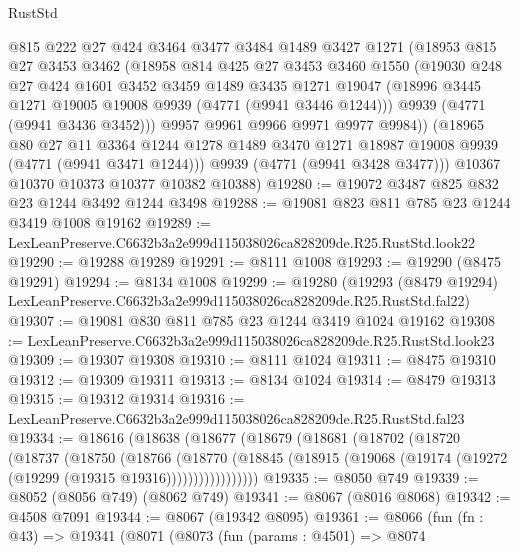 \begin{lexlean}{RustStd}
\begin{coremodule}
        @815
        @222
        @27
        @424
        @3464
        @3477
        @3484
        @1489
        @3427
        @1271
        (@18953
          @815
          @27
          @3453
          @3462
          (@18958
            @814
            @425
            @27
            @3453
            @3460
            @1550
            (@19030
              @248
              @27
              @424
              @1601
              @3452
              @3459
              @1489
              @3435
              @1271
              @19047
              (@18996 @3445 @1271 @19005 @19008 @9939 (@4771 (@9941 @3446 @1244)))
              @9939
              (@4771 (@9941 @3436 @3452)))
            @9957
            @9961
            @9966
            @9971
            @9977
            @9984))
        (@18965
          @80
          @27
          @11
          @3364
          @1244
          @1278
          @1489
          @3470
          @1271
          @18987
          @19008
          @9939
          (@4771 (@9941 @3471 @1244)))
        @9939
        (@4771 (@9941 @3428 @3477)))
      @10367
      @10370
      @10373
      @10377
      @10382
      @10388)
@19280 := @19072 @3487 @825 @832 @23 @1244 @3492 @1244 @3498
@19288 := @19081 @823 @811 @785 @23 @1244 @3419 @1008 @19162
@19289 := LexLeanPreserve.C6632b3a2e999d115038026ca828209de.R25.RustStd.look22
@19290 := @19288 @19289
@19291 := @8111 @1008
@19293 := @19290 (@8475 @19291)
@19294 := @8134 @1008
@19299 := @19280
    (@19293 (@8479 @19294) LexLeanPreserve.C6632b3a2e999d115038026ca828209de.R25.RustStd.fal22)
@19307 := @19081 @830 @811 @785 @23 @1244 @3419 @1024 @19162
@19308 := LexLeanPreserve.C6632b3a2e999d115038026ca828209de.R25.RustStd.look23
@19309 := @19307 @19308
@19310 := @8111 @1024
@19311 := @8475 @19310
@19312 := @19309 @19311
@19313 := @8134 @1024
@19314 := @8479 @19313
@19315 := @19312 @19314
@19316 := LexLeanPreserve.C6632b3a2e999d115038026ca828209de.R25.RustStd.fal23
@19334 := @18616
    (@18638
      (@18677
        (@18679
          (@18681
            (@18702
              (@18720
                (@18737
                  (@18750
                    (@18766
                      (@18770
                        (@18845
                          (@18915 (@19068 (@19174 (@19272 (@19299 (@19315 @19316)))))))))))))))))
@19335 := @8050 @749
@19339 := @8052 (@8056 @749) (@8062 @749)
@19341 := @8067 (@8016 @8068)
@19342 := @4508 @7091
@19344 := @8067 (@19342 @8095)
@19361 := @8066
    (fun (fn : @43) =>
    @19341
      (@8071
        (@8073
          (fun (params : @4501) =>
          @8074

\end{coremodule}
\end{lexlean}
